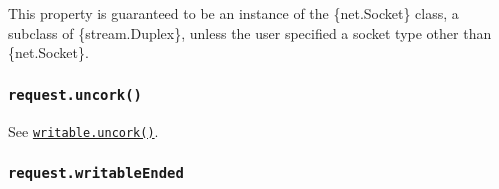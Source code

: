 \begin{Shaded}
\begin{Highlighting}[]
\OperatorTok{=} \NormalTok{(}\NormalTok{)}\OperatorTok{;}
\OperatorTok{=}\NormalTok{ \{}
  \OperatorTok{:} \OperatorTok{,}
\NormalTok{\}}\OperatorTok{;}
\OperatorTok{=}\OperatorTok{;}
\NormalTok{()}\OperatorTok{;}
\NormalTok{(}\OperatorTok{,}\KeywordTok{=\textgreater{}}\NormalTok{ \{}
  \OperatorTok{=}\OperatorTok{;}
  \OperatorTok{=}\OperatorTok{;}
  \NormalTok{(}\SpecialCharTok{$\{}\SpecialCharTok{\}}\SpecialCharTok{$\{}\SpecialCharTok{\}}\NormalTok{)}\OperatorTok{;}
\NormalTok{\})}\OperatorTok{;}
\end{Highlighting}
\end{Shaded}

This property is guaranteed to be an instance of the \{net.Socket\}
class, a subclass of \{stream.Duplex\}, unless the user specified a
socket type other than \{net.Socket\}.

\subsubsection{\texorpdfstring{\texttt{request.uncork()}}{request.uncork()}}\label{request.uncork}

See \href{stream.md\#writableuncork}{\texttt{writable.uncork()}}.

\subsubsection{\texorpdfstring{\texttt{request.writableEnded}}{request.writableEnded}}\label{request.writableended}

